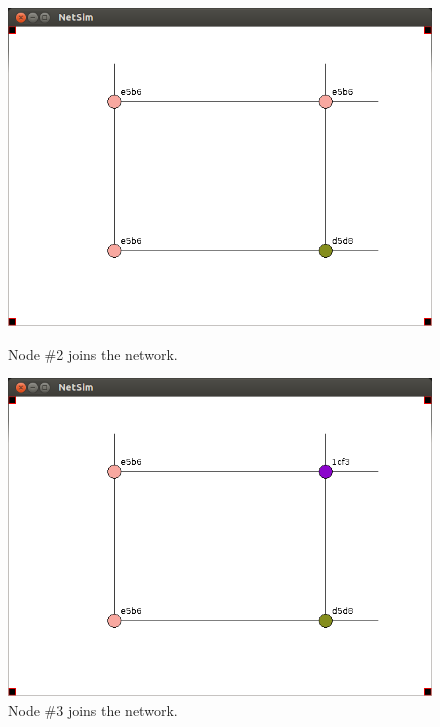 \documentclass[ %
                    author={Luke Murray},
                supervisor={Dr. Simon Hollis},
                     title={Shadow Peer-to-Peer Networks},
                  subtitle={},
                    degree={MEng},
                      year={2013} ]{thesis}
\begin{document}
\begin{figure}[h]
    \centering
    \begin{minipage}[b]{0.45\linewidth}
        \centering
        \includegraphics[width=\linewidth]{sim_pics/expand_3.png}
        \caption{Node \#2 joins the network.}
        \label{sim_expand3}
    \end{minipage}
    \hspace{0.5cm}
    \begin{minipage}[b]{0.45\linewidth}
        \centering
        \includegraphics[width=\linewidth]{sim_pics/expand_4.png}
        \caption{Node \#3 joins the network.}
        \label{sim_expand4}
    \end{minipage}
\end{figure}
\end{document}

